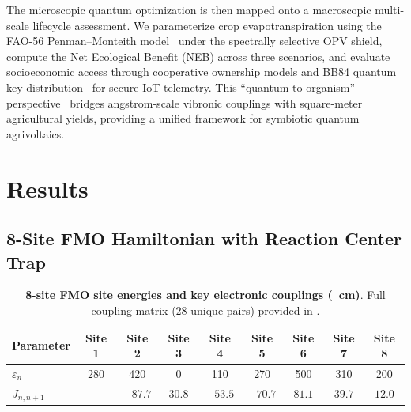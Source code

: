 \documentclass[12pt]{article}
\begin{document}
The microscopic quantum optimization is then mapped onto a macroscopic multi-scale lifecycle assessment.
We parameterize crop evapotranspiration using the FAO-56 Penman--Monteith model~\cite{Allen1998} under the spectrally selective OPV shield, compute the Net Ecological Benefit (NEB) across three scenarios, and evaluate socioeconomic access through cooperative ownership models and BB84 quantum key distribution~\cite{Bennett1984} for secure IoT telemetry.
This ``quantum-to-organism'' perspective~\cite{Vandamme2025} bridges angstrom-scale vibronic couplings with square-meter agricultural yields, providing a unified framework for symbiotic quantum agrivoltaics.


\section*{Results}

\subsection*{8-Site FMO Hamiltonian with Reaction Center Trap}

\begin{table}[htbp]
\centering
\caption{\textbf{8-site FMO site energies and key electronic couplings (\si{\per\cm})}. Full coupling matrix (28 unique pairs) provided in .}
\label{tab:fmo_parameters}
\begin{tabular}{lcccccccc}
\toprule
\textbf{Parameter} & \textbf{Site 1} & \textbf{Site 2} & \textbf{Site 3} & \textbf{Site 4} & \textbf{Site 5} & \textbf{Site 6} & \textbf{Site 7} & \textbf{Site 8} \\
\midrule
$\varepsilon_n$ & 280 & 420 & 0 & 110 & 270 & 500 & 310 & 200 \\
$J_{n,n+1}$ & --- & $-87.7$ & $30.8$ & $-53.5$ & $-70.7$ & $81.1$ & $39.7$ & $12.0$ \\
\bottomrule
\end{tabular}
\end{table}
\end{document}
